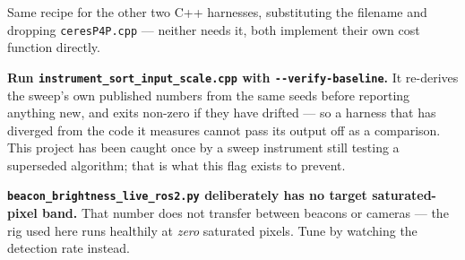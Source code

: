 \documentclass[11pt]{report}
\newenvironment{warningbox}%
  {\begin{lrbox}{\warnbox}\begin{minipage}{0.90\textwidth}}%
  {\end{minipage}\end{lrbox}%
   \begin{center}\fcolorbox{black}{codebg}{\usebox{\warnbox}}\end{center}}
\begin{document}
Same recipe for the other two C++ harnesses, substituting the filename and
dropping \texttt{ceresP4P.cpp} --- neither needs it, both implement their
own cost function directly.

\begin{warningbox}
\textbf{Run \texttt{instrument\_sort\_input\_scale.cpp} with
\texttt{-{}-verify-baseline}.} It re-derives the sweep's own published
numbers from the same seeds before reporting anything new, and exits
non-zero if they have drifted --- so a harness that has diverged from the
code it measures cannot pass its output off as a comparison. This
project has been caught once by a sweep instrument still testing a
superseded algorithm; that is what this flag exists to prevent.
\end{warningbox}

\textbf{\texttt{beacon\_brightness\_live\_ros2.py} deliberately has no
target saturated-pixel band.} That number does not transfer between
beacons or cameras --- the rig used here runs healthily at \emph{zero}
saturated pixels. Tune by watching the detection rate instead.
\end{document}
